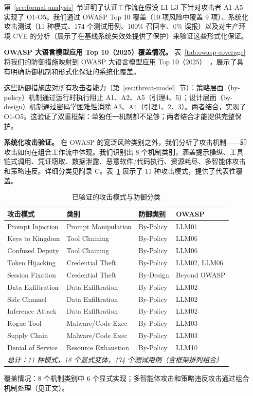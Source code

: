 第~\ref{sec:formal-analysis}~节证明了认证工作流在假设 L1-L3 下针对攻击者 A1-A5 实现了 O1-O5。我们通过 OWASP Top 10 覆盖（10 项风险中覆盖 9 项）、系统化攻击测试（11 种模式、174 个测试用例、100\% 召回率、0\% 误报）以及对生产环境 CVE 的分析（展示了在基线系统失效处提供了保护）来验证这些形式化保证。

\noindent\textbf{OWASP 大语言模型应用 Top 10（2025）覆盖情况。} 表~\ref{tab:owasp-coverage} 将我们的防御措施映射到 OWASP 大语言模型应用 Top 10（2025）~\cite{owasp-llm-2025}，展示了具有明确防御机制和形式化保证的系统化覆盖。


这些防御措施应对所有攻击者能力（第~\ref{sec:threat-model}~节）：策略层面（by-policy）机制通过运行时执行阻止 A1、A2、A5（引理4、5）；设计层面（by-design）机制通过密码学困难性消除 A3、A4（引理1、2、3）。两者结合，实现了 O1-O5。这验证了双重框架：单独任一机制都不足够；两者结合才能提供完整保护。

\noindent\textbf{系统化攻击验证。} 在 OWASP 的宽泛风险类别之外，我们分析了攻击机制——即攻击如何在组合工作流中体现。我们识别出 8 个机制类别，涵盖提示操纵、工具链式调用、凭证窃取、数据泄露、恶意软件/代码执行、资源耗尽、多智能体攻击和策略违反。详细分类见附录 C。表~\ref{tab:attack-patterns} 展示了 11 种攻击模式，提供了代表性覆盖。

\begin{table}[t]
\centering
\caption{已验证的攻击模式与防御分类}
\label{tab:attack-patterns}
\scriptsize
\begin{tabular}{|p{3.5cm}|p{3.5cm}|p{2.5cm}|p{3cm}|}
\hline
\textbf{攻击模式} & \textbf{类别} & \textbf{防御类别} & \textbf{OWASP} \\
\hline
Prompt Injection & Prompt Manipulation & By-Policy & LLM01 \\
\hline
Keys to Kingdom & Tool Chaining & By-Policy & LLM06 \\
\hline
Confused Deputy & Tool Chaining & By-Policy & LLM06 \\
\hline
Token Hijacking & Credential Theft & By-Policy & LLM02, LLM06 \\
\hline
Session Fixation & Credential Theft & By-Design & Beyond OWASP \\
\hline
Data Exfiltration & Data Exfiltration & By-Policy & LLM02 \\
\hline
Side Channel & Data Exfiltration & By-Policy & LLM02 \\
\hline
Inference Attack & Data Exfiltration & By-Policy & LLM02 \\
\hline
Rogue Tool & Malware/Code Exec & By-Policy & LLM03 \\
\hline
Supply Chain & Malware/Code Exec & By-Policy & LLM03 \\
\hline
Denial of Service & Resource Exhaustion & By-Policy & LLM10 \\
\hline
\multicolumn{4}{|l|}{\small\textit{总计：11 种模式，18 个显式变体，174 个测试用例（含框架排列组合）}} \\
\hline
\end{tabular}

\raggedright
\scriptsize{覆盖情况：8 个机制类别中 6 个显式实现；多智能体攻击和策略违反攻击通过组合机制处理（见正文）。}
\end{table}

